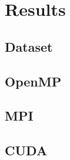 \chapter{Results}
\label{results_computations}
\section{Dataset}
\section{OpenMP}
\section{MPI}
\section{CUDA}